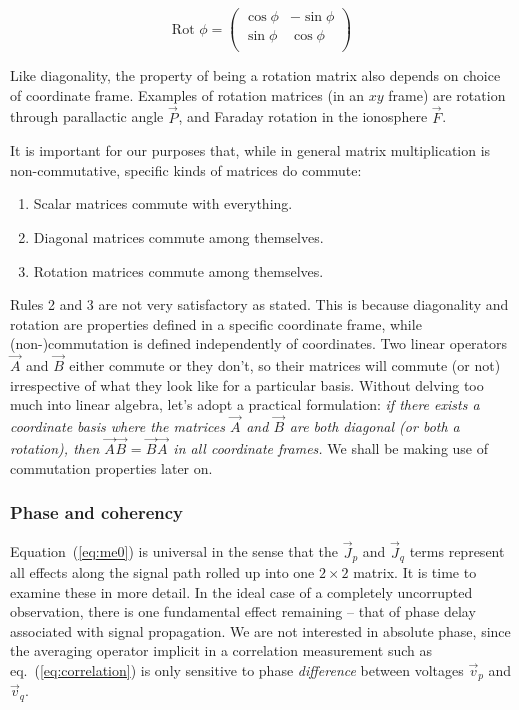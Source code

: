 \documentclass[]{aa}
\newcommand{\jones}[2]{\vec {#1}_{#2}}
\begin{document}
    \[
    \mbox{Rot~}\phi = 
    \left( 
    \begin{array}{cc}
    \cos\phi & -\sin\phi \\
    \sin\phi & \cos\phi \\
    \end{array}
    \right) 
    \]

Like diagonality, the property of being a rotation matrix also depends on choice of coordinate frame. Examples of rotation matrices (in an $xy$ frame) are rotation through parallactic angle $\jones{P}{}$, and Faraday rotation in the ionosphere $\jones{F}{}$.

It is important for our purposes that, while in general matrix multiplication is non-commutative, specific kinds of matrices do commute:

\begin{enumerate}
\item Scalar matrices commute with everything.
\item Diagonal matrices commute among themselves.
\item Rotation matrices commute among themselves. 
\end{enumerate}

Rules 2 and 3 are not very satisfactory as stated. This is because diagonality and rotation are properties defined in a specific coordinate frame, while (non-)commutation is defined independently of coordinates. Two linear operators $\jones{A}{}$ and $\jones{B}{}$ either commute or they don't, so their matrices will commute (or not) irrespective of what they look like for a particular basis. Without delving too much into linear algebra, let's adopt a practical formulation: {\em if there exists a coordinate basis where the matrices $\jones{A}{}$ and $\jones{B}{}$ are both diagonal (or both a rotation), then $\jones{A}{} \jones{B}{}=\jones{B}{}\jones{A}{}$ in all coordinate frames.} We shall be making use of commutation properties later on.

\subsubsection{\label{sec:coherency}Phase and coherency}

Equation~(\ref{eq:me0}) is universal in the sense that the $\jones{J}{p}$ and $\jones{J}{q}$ terms represent all effects along the signal path rolled up into one $2\times2$ matrix. It is time to examine these in more detail. In the ideal case of a completely uncorrupted observation, there is one fundamental effect remaining -- that of phase delay associated with signal propagation. We are not interested in absolute phase, since the averaging operator implicit in a correlation measurement such as eq.~(\ref{eq:correlation}) is only sensitive to phase {\em difference} between voltages $\vec v_p$ and $\vec v_q$. 
\end{document}
